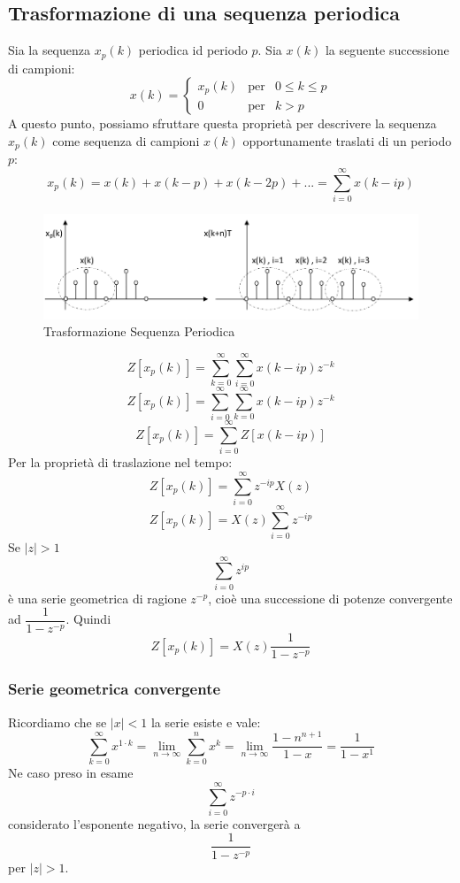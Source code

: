 \documentclass[a4paper]{report}
\begin{document}
\subsection{Trasformazione di una sequenza periodica}
Sia la sequenza $x_p(k)$ periodica id periodo $p$. Sia $x(k)$ la
seguente successione di campioni:
\[
x(k) =
\left\{
\begin{array}{lll}
  x_p(k) & \textrm{per} & 0 \leq k \leq p\\
  0 & \textrm{per} & k > p
\end{array}
\right.
\]
A questo punto, possiamo sfruttare questa propriet\`a per descrivere
la sequenza $x_p(k)$ come sequenza di campioni $x(k)$ opportunamente
traslati di un periodo $p$:
\[
x_p(k) = x(k) + x(k - p) + x(k -2p) + ... = \sum_{i = 0}^{\infty} x(k
- ip)
\]
\begin{figure}[!h]
  \begin{center}
    \includegraphics[scale=0.4]{./figures/trasformazioneSequenzaPeriodica}
    \caption{Trasformazione Sequenza
      Periodica}\label{fig:circonferenzaUnitaria} 
  \end{center}
\end{figure}
\[
Z[x_p(k)] = \sum_{k=0}^{\infty} \sum_{i = 0}^{\infty} x(k- ip) z^{-k}
\]
\[
Z[x_p(k)] = \sum_{i=0}^{\infty} \sum_{k = 0}^{\infty} x(k- ip) z^{-k}
\]
\[
Z[x_p(k)] = \sum_{i=0}^{\infty} Z[x(k - ip)]
\]
Per la propriet\`a di traslazione nel tempo:
\[
Z[x_p(k)] = \sum_{i=0}^{\infty} z^{-ip}X(z)
\]
\[
Z[x_p(k)] = X(z)\sum_{i=0}^{\infty} z^{-ip}
\]
Se $|z| > 1$ 
\[
\sum_{i=0}^{\infty} z^{ip}
\]
\`e una serie geometrica di ragione $z^{-p}$, cio\`e una successione
di potenze convergente ad $\dfrac{1}{1 - z^{-p}}$. Quindi
\[
Z[x_p(k)] = X(z) \dfrac{1}{1 - z^{-p}}
\]

\subsubsection{Serie geometrica convergente}
Ricordiamo che se $|x| < 1$ la serie esiste e vale:
\[
\sum_{k=0}^{\infty} x^{1 \cdot k} = \lim\limits_{n \to \infty} \sum_{k=0}^{n}
x^k = \lim\limits_{n \to \infty} \dfrac{1 - n^{n + 1}}{1 - x} =
\dfrac{1}{1 - x^{1}}
\]
Ne caso preso in esame
\[
\sum_{i=0}^{\infty} z^{-p \cdot i}
\]
considerato l'esponente negativo, la serie converger\`a a
\[
\dfrac{1}{1 - z^{-p}}
\]
per $|z| > 1$.
\end{document}
